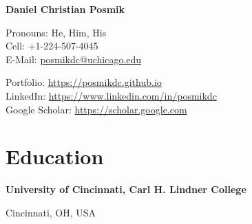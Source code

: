 \documentclass[a4paper,20pt]{article}
\begin{document}
\nocite{*}


\begin{center}
	\textbf{{\LARGE \color{black} Daniel Christian Posmik}}
\end{center}
\vspace{2pt}

	\begin{minipage}{.45\linewidth} 
		\begin{flushleft}
    			Pronouns: He, Him, His \\ 
    			Cell: +1-224-507-4045 \\
    			E-Mail: \href{mailto:posmikdc@uchicago.edu} {posmikdc@uchicago.edu}
    		\end{flushleft} 
    	\end{minipage}
    \hfill 
    \begin{minipage}{.50\linewidth}
    		\begin{flushright}
                        Portfolio: \href{https://posmikdc.github.io/}
                        {https://posmikdc.github.io} \\
            	 	LinkedIn: \href{https://www.linkedin.com/in/posmikdc/}           {https://www.linkedin.com/in/posmikdc} \\
    	 		Google Scholar: \href{https://scholar.google.com/citations?hl=en&user=sRuEm5oAAAAJ}{https://scholar.google.com} 
    		\end{flushright}
    	\end{minipage}

\vspace{5pt}


\section{Education}
    \begin{minipage}{.75\linewidth} \begin{flushleft}
    		\textbf{University of Cincinnati, Carl H. Lindner College}
    	\end{flushleft} \end{minipage}
    \hfill 
    \begin{minipage}{.20\linewidth}\begin{flushright}
    	 Cincinnati, OH, USA
    	\end{flushright}\end{minipage}
    	
\end{document}
